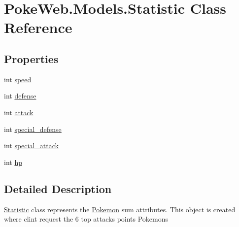 \hypertarget{class_poke_web_1_1_models_1_1_statistic}{}\section{Poke\+Web.\+Models.\+Statistic Class Reference}
\label{class_poke_web_1_1_models_1_1_statistic}
\subsection*{Properties}
\begin{DoxyCompactItemize}
\item 
int \mbox{\hyperlink{class_poke_web_1_1_models_1_1_statistic_adde59f67e6296c8557f35cefb422da34}{speed}}
\item 
int \mbox{\hyperlink{class_poke_web_1_1_models_1_1_statistic_a16b525d351bdddcced3a66fbb695a7de}{defense}}
\item 
int \mbox{\hyperlink{class_poke_web_1_1_models_1_1_statistic_abbb2828f554117e55eef4cb42f0cf315}{attack}}
\item 
int \mbox{\hyperlink{class_poke_web_1_1_models_1_1_statistic_a0bab71d5765c664af820349a3bd3ebfd}{special\+\_\+defense}}
\item 
int \mbox{\hyperlink{class_poke_web_1_1_models_1_1_statistic_af02035e2eb7d45f5ecb79743ff96a765}{special\+\_\+attack}}
\item 
int \mbox{\hyperlink{class_poke_web_1_1_models_1_1_statistic_a27c55b3b5ef9ab129af79eff794664b1}{hp}}
\end{DoxyCompactItemize}


\subsection{Detailed Description}
\mbox{\hyperlink{class_poke_web_1_1_models_1_1_statistic}{Statistic}} class represents the \mbox{\hyperlink{class_poke_web_1_1_models_1_1_pokemon}{Pokemon}} sum attributes. This object is created where clint request the 6 top attacks points Pokemons 

